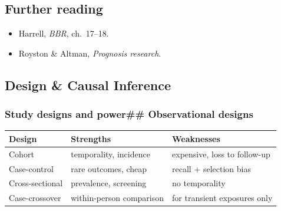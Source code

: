 \documentclass[
]{article}
\newcounter{none} %
\providecommand{\tightlist}{%
  \setlength{\itemsep}{0pt}\setlength{\parskip}{0pt}}
\begin{document}
\subsection{Further reading}\label{further-reading-7}

\begin{itemize}
\tightlist
\item
  Harrell, \emph{BBR}, ch.~17--18.
\item
  Royston \& Altman, \emph{Prognosis research}.
\end{itemize}

\subsection{Design \& Causal Inference}\label{design-causal-inference}

\subsubsection{Study designs and power\#\# Observational
designs}\label{study-designs-and-power-observational-designs}

{\def\LTcaptype{none} %
\begin{longtable}[]{@{}
  >{\raggedright\arraybackslash}p{}
  >{\raggedright\arraybackslash}p{}
  >{\raggedright\arraybackslash}p{}@{}}
\toprule\noalign{}
\begin{minipage}[b]{\linewidth}\raggedright
Design
\end{minipage} & \begin{minipage}[b]{\linewidth}\raggedright
Strengths
\end{minipage} & \begin{minipage}[b]{\linewidth}\raggedright
Weaknesses
\end{minipage} \\
\midrule\noalign{}
\endhead
\bottomrule\noalign{}
\endlastfoot
Cohort & temporality, incidence & expensive, loss to follow-up \\
Case-control & rare outcomes, cheap & recall + selection bias \\
Cross-sectional & prevalence, screening & no temporality \\
Case-crossover & within-person comparison & for transient exposures
only \\
\end{longtable}
}
\end{document}
